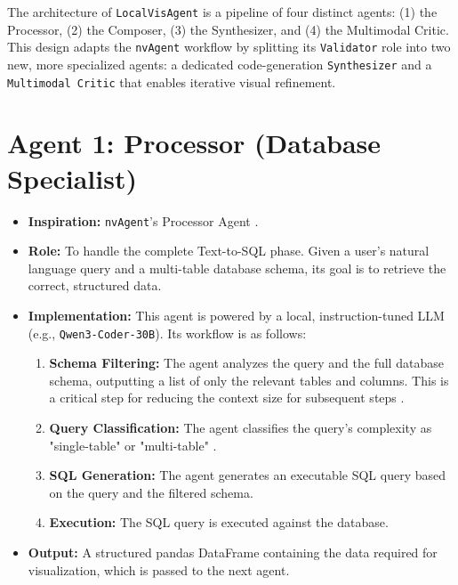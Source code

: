 \documentclass[a4paper,oneside,bibliography=totoc]{scrbook}
\begin{document}
The architecture of \texttt{LocalVisAgent} is a pipeline of four distinct agents: (1) the Processor, (2) the Composer, (3) the Synthesizer, and (4) the Multimodal Critic. This design adapts the \texttt{nvAgent} workflow by splitting its \texttt{Validator} role into two new, more specialized agents: a dedicated code-generation \texttt{Synthesizer} and a \texttt{Multimodal Critic} that enables iterative visual refinement.

\section{Agent 1: Processor (Database Specialist)}
\begin{itemize}
 \item \textbf{Inspiration:} \texttt{nvAgent}'s Processor Agent \cite{[3, 6]}.
 \item \textbf{Role:} To handle the complete Text-to-SQL phase. Given a user's natural language query and a multi-table database schema, its goal is to retrieve the correct, structured data.
 \item \textbf{Implementation:} This agent is powered by a local, instruction-tuned LLM (e.g., \texttt{Qwen3-Coder-30B}). Its workflow is as follows:
 \begin{enumerate}
 \item \textbf{Schema Filtering:} The agent analyzes the query and the full database schema, outputting a list of only the relevant tables and columns. This is a critical step for reducing the context size for subsequent steps \cite{[6]}.
 \item \textbf{Query Classification:} The agent classifies the query's complexity as "single-table" or "multi-table" \cite{[3]}.
 \item \textbf{SQL Generation:} The agent generates an executable SQL query based on the query and the filtered schema.
 \item \textbf{Execution:} The SQL query is executed against the database.
 \end{enumerate}
 \item \textbf{Output:} A structured pandas DataFrame containing the data required for visualization, which is passed to the next agent.
\end{itemize}
\end{document}

